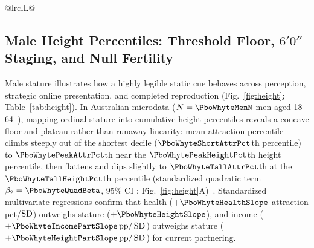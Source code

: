 \begin{table}[!t]
\caption{Male Stature Percentiles Across Attraction, $6'0''$ Platform Staging, Union History, and Meta-Analytic Fertility.}\label{tab:height}
\scriptsize
\setlength{\tabcolsep}{4.2pt}
\begin{tabularx}{\textwidth}{@{}lrclL@{}}
\toprule
{}
\bottomrule
\end{tabularx}
\end{table}

\subsection{Male Height Percentiles: Threshold Floor, \texorpdfstring{$6'0''$}{6'0"} Staging, and Null Fertility}
Male stature illustrates how a highly legible static cue behaves across perception, strategic online presentation, and completed reproduction (Fig.~\ref{fig:height}; Table~\ref{tab:height}). In Australian microdata ($N=\PboWhyteMenN$ men aged 18--64~\cite{whyte2021}), mapping ordinal stature into cumulative height percentiles reveals a concave floor-and-plateau rather than runaway linearity: mean attraction percentile climbs steeply out of the shortest decile ($\PboWhyteShortAttrPct$th percentile) to $\PboWhytePeakAttrPct$th near the $\PboWhytePeakHeightPct$th height percentile, then flattens and dips slightly to $\PboWhyteTallAttrPct$th at the $\PboWhyteTallHeightPct$th percentile (standardized quadratic term $\beta_2=\PboWhyteQuadBeta$, 95\% CI \PboWhyteQuadCI; Fig.~\ref{fig:height}A)~\cite{stulp2012,stulp2013}. Standardized multivariate regressions confirm that health ($+\PboWhyteHealthSlope$ attraction pct/$\operatorname{SD}$) outweighs stature ($+\PboWhyteHeightSlope$), and income ($+\PboWhyteIncomePartSlope\,\mathrm{pp}/\SD$) outweighs stature ($+\PboWhyteHeightPartSlope\,\mathrm{pp}/\SD$) for current partnering.

